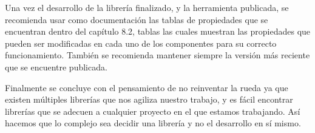Una vez el desarrollo de la librería finalizado, y la herramienta publicada, se recomienda usar como documentación las tablas de propiedades que se encuentran dentro del capítulo 8.2, tablas las cuales muestran las propiedades que pueden ser modificadas en cada uno de los componentes para su correcto funcionamiento.
También se recomienda mantener siempre la versión más reciente que se encuentre publicada.

Finalmente se concluye con el pensamiento de no reinventar la rueda ya que existen múltiples librerías que nos agiliza nuestro trabajo, y es fácil encontrar librerías que se adecuen a cualquier proyecto en el que estamos trabajando. Así hacemos que lo complejo sea decidir una librería y no el desarrollo en sí mismo.
